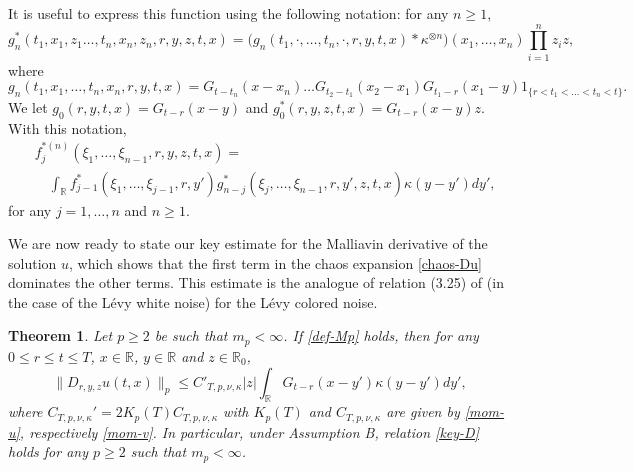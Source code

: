 \documentclass[12pt]{article}
\newtheorem{theorem}{Theorem}[section]
\def\bR{\mathbb{R}}
\def\k{\kappa}
\begin{document}
It is useful to express this function using the following notation: for any $n\geq 1$,
\begin{equation}
\label{def-gn*}
g_n^*(t_1,x_1,z_1\ldots,t_n,x_n,z_n,r,y,z,t,x)= \big(g_n(t_1,\cdot,\ldots,t_n,\cdot,r,y,t,x)* \k^{\otimes n}\big)(x_1,\ldots,x_n) \prod_{i=1}^n z_{i} z,
\end{equation}
where
\[
g_n(t_1,x_1,\ldots,t_n,x_n,r,y,t,x)=G_{t-t_n}(x-x_n)\ldots G_{t_2-t_1}(x_2-x_1)G_{t_1-r}(x_1-y) 1_{\{r<t_1<\ldots<t_n<t\}}.
\]
We let $g_0(r,y,t,x)=G_{t-r}(x-y)$ and $g_0^*(r,y,z,t,x)=G_{t-r}(x-y)z$. With this notation, 
\begin{align*}
& f_j^{*(n)}(\xi_1,\ldots,\xi_{n-1},r,y,z,t,x)= \\
& \quad \int_{\bR}f_{j-1}^* (\xi_1,\ldots,\xi_{j-1},r,y') g_{n-j}^*(\xi_j,\ldots,\xi_{n-1},r,y',z,t,x)\k(y-y')dy',
\end{align*}
for any $j=1,\ldots,n$ and $n\geq 1$.

\medskip

We are now ready to state our key estimate for the Malliavin derivative of the solution $u$, which shows that the first term in the chaos expansion \eqref{chaos-Du} dominates the other terms. This estimate is the analogue of relation (3.25) of \cite{BZ24} (in the case of the L\'evy white noise) for the L\'evy colored noise.

\begin{theorem}
\label{key-thD}
Let $p\geq 2$ be such that $m_p<\infty$. If \eqref{def-Mp} holds,
then for any $0\leq r\leq t \leq T$, $x \in \bR$, $y \in \bR$ and $z \in \bR_0$,
\begin{equation}
\label{key-D}
\|D_{r,y,z}u(t,x)\|_p \leq C'_{T,p,\nu,\k}|z| \int_{\bR}G_{t-r}(x-y')\k(y-y')dy',
\end{equation}
where $C_{T,p,\nu,\k}'=2K_p(T) C_{T,p,\nu,\k}$ with $K_p(T)$ and $C_{T,p,\nu,\k}$ are given by
\eqref{mom-u}, respectively \eqref{mom-v}. In particular, under Assumption B, relation \eqref{key-D} holds for any $p\geq 2$ such that $m_p<\infty$.
\end{theorem}
\end{document}

